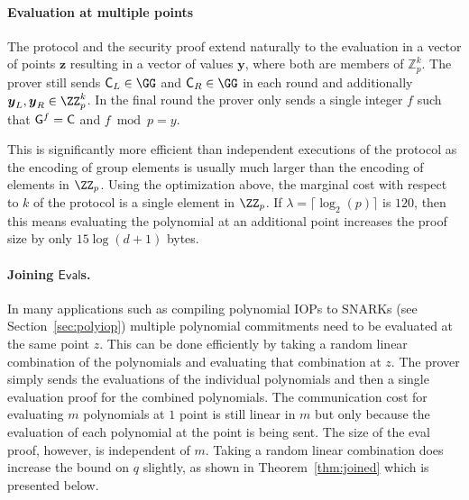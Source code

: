 
\paragraph{Evaluation at multiple points}
The protocol and the security proof extend naturally to the evaluation in a vector of points $\boldsymbol{z}$ resulting in a vector of values $\boldsymbol{y}$, where both are members of $\mathbb{Z}_p^k$. The prover still sends $\gr{C}_L\in \GG$ and $\gr{C}_R\in \GG$ in each round and additionally $\boldsymbol{y}_L,\boldsymbol{y}_R \in \ZZ^k_p$. In the final round the prover only sends a single integer $f$ such that $\gr{g}^{f}=\gr{C}$ and $f \bmod p=y$.

This is significantly more efficient than independent executions of the protocol as the encoding of group elements is usually much larger than the encoding of elements in $\ZZ_p$. Using the optimization above, the marginal cost with respect to $k$ of the protocol is a single element in $\ZZ_p$. If $\lambda=\lceil\log_2(p)\rceil$ is $120$, then this means evaluating the polynomial at an additional point increases the proof size by only $15\log(d+1)$ bytes.


\paragraph{Joining $\mathsf{Eval}$s.} 
In many applications such as compiling polynomial IOPs to SNARKs (see Section~\ref{sec:polyiop}) multiple polynomial commitments need to be evaluated at the same point $z$. 
This can be done efficiently by taking a random linear combination of the polynomials and evaluating that combination at $z$. The prover simply sends the evaluations of the individual polynomials and then a single evaluation proof for the combined polynomials. The communication cost for evaluating $m$ polynomials at $1$ point is still linear in $m$ but only because the evaluation of each polynomial at the point is being sent. The size of the eval proof, however, is independent of $m$. 
Taking a random linear combination does increase the bound on $q$ slightly, as shown in Theorem~\ref{thm:joined} which is presented below.

